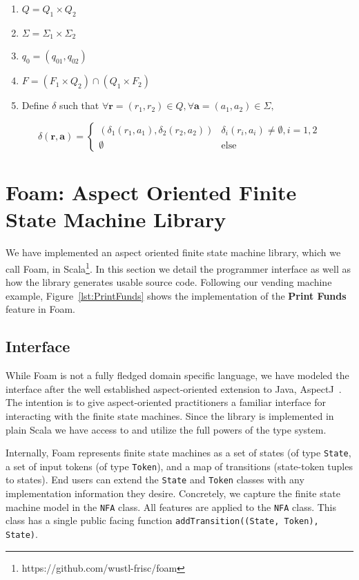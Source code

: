 \documentclass[sigplan,anonymous,review]{acmart}
\begin{document}
\begin{enumerate}
    \item $Q = Q_1 \times Q_2$
    \item $\Sigma = \Sigma_1 \times \Sigma_2$
    \item $q_0 = (q_{01}, q_{02})$
    \item $F = (F_1 \times Q_2) \cap (Q_1 \times F_2)$
    \item Define $\delta$ such that $\forall \mathbf{r} = (r_1, r_2) \in Q, \forall \mathbf{a} = (a_1, a_2) \in \Sigma,$ 
\end{enumerate}
\[\delta(\mathbf r, \mathbf a) = \begin{cases}
    (\delta_1(r_1, a_1), \delta_2(r_2, a_2)) & \delta_i(r_i, a_i) \neq \emptyset, i = 1, 2\\
    \emptyset & \mathrm{else}
\end{cases}\]


\section{Foam: Aspect Oriented Finite State Machine Library}
We have implemented an aspect oriented finite state machine library, which we call Foam,  in Scala\footnote{https://github.com/wustl-frisc/foam}. In this section we detail the programmer interface as well as how the library generates usable source code. Following our vending machine example, Figure~\ref{lst:PrintFunds} shows the implementation of the \textbf{Print Funds} feature in Foam.

\subsection{Interface}
While Foam is not a fully fledged domain specific language, we have modeled the interface after the well established aspect-oriented extension to Java, AspectJ~\cite{}. The intention is to give aspect-oriented practitioners a familiar interface for interacting with the finite state machines. Since the library is implemented in plain Scala we have access to and utilize the full powers of the type system. 

Internally, Foam represents finite state machines as a set of states (of type \texttt{State}, a set of input tokens (of type \texttt{Token}), and a map of transitions (state-token tuples to states). End users can extend the \texttt{State} and \texttt{Token} classes with any implementation information they desire. Concretely, we capture the finite state machine model in the \texttt{NFA} class. All features are applied to the \texttt{NFA} class. This class has a single public facing function \texttt{addTransition((State, Token), State)}.
\end{document}
